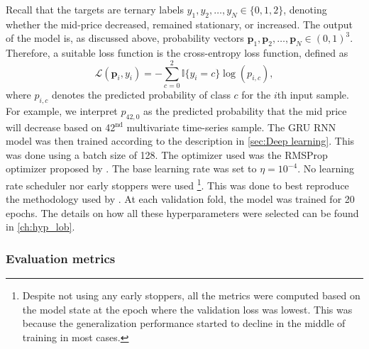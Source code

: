 \documentclass{statsmsc}
\begin{document}
{Recall that the targets are ternary labels $y_1,y_2,\dots,y_N \in \{0,1,2\}$, denoting whether the mid-price
decreased, remained stationary, or increased. The output of the model is, as discussed above,
probability vectors $\mathbf{p}_1, \mathbf{p}_2,\dots, \mathbf{p}_N \in
(0,1)^3$. Therefore, a suitable loss function is the cross-entropy loss
function, defined as
\begin{equation}
    \mathcal{L}(\mathbf{p}_i, y_i)=-\sum^{2}_{c=0} \mathbb{I}\{y_i=c\} \log \left( p_{i,c} \right),
\end{equation}
where $p_{i,c}$ denotes the predicted probability of class $c$ for the $i$th input sample.
For example, we interpret $p_{42,0}$ as the predicted probability that the mid price will decrease
based on 42$^{\textrm{nd}}$ multivariate time-series sample.
The \ac{GRU} \ac{RNN} model was then trained according to the description in
\cref{sec:Deep learning}. This was done using a batch size of 128. The optimizer used
was the RMSProp optimizer proposed by \cite{rmsprop}. The base learning rate was set to
$\eta=10^{-4}$. No learning rate scheduler nor early stoppers were used%
\footnote{%
    Despite not using any early stoppers,
    all the metrics were computed based on the model state at the epoch where the validation loss
    was lowest. This was because
    the generalization performance started to decline in the middle of training in most cases.
}.
This was done to best reproduce the methodology used by \cite{dain}.
At each validation fold, the model was trained for 20
epochs. The details on how all these hyperparameters were selected can be found in
\cref{ch:hyp_lob}.

\subsubsection{Evaluation metrics}%
\label{ssub:Evaluation metrics}

}
\end{document}
